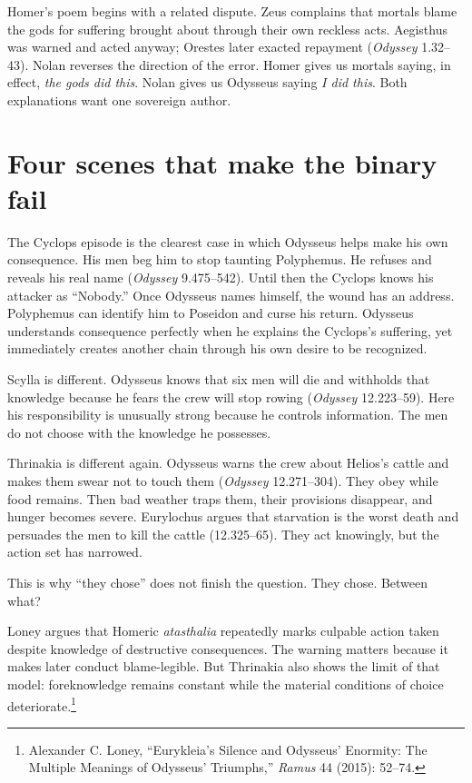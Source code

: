 \documentclass[11pt]{article}
\newcommand{\Od}{\textit{Odyssey}}
\begin{document}
Homer's poem begins with a related dispute. Zeus complains that mortals blame the gods for suffering brought about through their own reckless acts. Aegisthus was warned and acted anyway; Orestes later exacted repayment (\Od{} 1.32--43). Nolan reverses the direction of the error. Homer gives us mortals saying, in effect, \emph{the gods did this}. Nolan gives us Odysseus saying \emph{I did this}. Both explanations want one sovereign author.

\section{Four scenes that make the binary fail}

The Cyclops episode is the clearest case in which Odysseus helps make his own consequence. His men beg him to stop taunting Polyphemus. He refuses and reveals his real name (\Od{} 9.475--542). Until then the Cyclops knows his attacker as ``Nobody.'' Once Odysseus names himself, the wound has an address. Polyphemus can identify him to Poseidon and curse his return. Odysseus understands consequence perfectly when he explains the Cyclops's suffering, yet immediately creates another chain through his own desire to be recognized.

Scylla is different. Odysseus knows that six men will die and withholds that knowledge because he fears the crew will stop rowing (\Od{} 12.223--59). Here his responsibility is unusually strong because he controls information. The men do not choose with the knowledge he possesses.

Thrinakia is different again. Odysseus warns the crew about Helios's cattle and makes them swear not to touch them (\Od{} 12.271--304). They obey while food remains. Then bad weather traps them, their provisions disappear, and hunger becomes severe. Eurylochus argues that starvation is the worst death and persuades the men to kill the cattle (12.325--65). They act knowingly, but the action set has narrowed.

This is why ``they chose'' does not finish the question. They chose. Between what?

Loney argues that Homeric \textit{atasthalia} repeatedly marks culpable action taken despite knowledge of destructive consequences. The warning matters because it makes later conduct blame-legible. But Thrinakia also shows the limit of that model: foreknowledge remains constant while the material conditions of choice deteriorate.\footnote{Alexander C. Loney, ``Eurykleia's Silence and Odysseus' Enormity: The Multiple Meanings of Odysseus' Triumphs,'' \textit{Ramus} 44 (2015): 52--74.}
\end{document}
